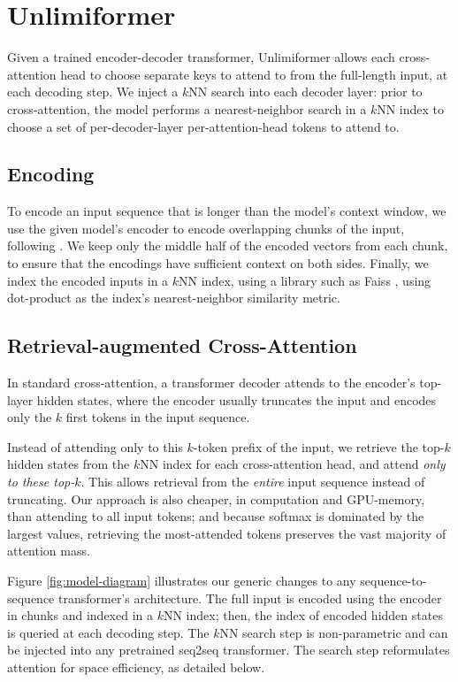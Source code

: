 \documentclass{article}
\newcommand{\ours}{Unlimiformer\xspace}
\begin{document}
\section{\ours }
Given a trained encoder-decoder  transformer,
\ours allows each cross-attention head to choose separate keys to attend to from the full-length input, at each decoding step. 
We inject a $k$NN search into each decoder layer: prior to cross-attention, the model performs a nearest-neighbor search in a $k$NN index to choose a set of per-decoder-layer per-attention-head tokens to attend to.



\subsection{Encoding} To encode an input sequence that is longer than the model's context window, we use the given model's encoder to encode overlapping chunks of the input,
following \citet{sled}. We keep only the middle half of the encoded vectors from each chunk, to ensure that the encodings have sufficient context on both sides. Finally, we index the encoded inputs in a $k$NN index, using a library such as Faiss \citep{faiss}, using dot-product as the index's nearest-neighbor similarity metric.



\subsection{Retrieval-augmented Cross-Attention}
In standard cross-attention, a transformer decoder attends to the encoder's top-layer hidden states,
where the encoder usually truncates the input and encodes only the $k$ first tokens in the input sequence.

Instead of attending  only to this $k$-token prefix of the input, we retrieve the top-$k$ hidden states from the $k$NN index for each cross-attention head, and attend \emph{only to these top-$k$}.
This allows retrieval from the \emph{entire} input sequence instead of truncating.
Our approach is also cheaper, in computation and GPU-memory, than attending to all input tokens; and because softmax is dominated by the largest values, retrieving the most-attended tokens preserves the vast majority of attention mass. %


Figure \ref{fig:model-diagram} illustrates our generic changes to any sequence-to-sequence transformer's architecture. 
The full input is encoded using the encoder in chunks and indexed in a $k$NN index; 
then, the index of encoded hidden states is queried at each decoding step.
The $k$NN search step is non-parametric and can be injected into any pretrained seq2seq transformer. The search step reformulates attention for space efficiency, as detailed below. 
\end{document}
